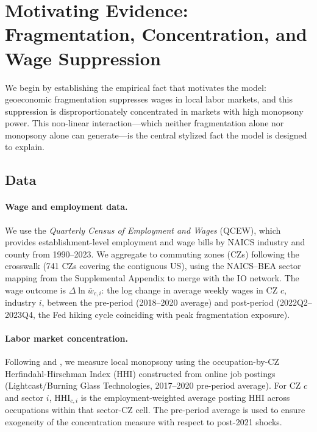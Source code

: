 \section{Motivating Evidence: Fragmentation, Concentration, and Wage Suppression}
\label{sec:empirical}

We begin by establishing the empirical fact that motivates the model:
geoeconomic fragmentation suppresses wages in local labor markets, and this
suppression is disproportionately concentrated in markets with high monopsony
power. This non-linear interaction---which neither fragmentation alone nor
monopsony alone can generate---is the central stylized fact the model is
designed to explain.

\subsection{Data}
\label{sec:data}

\paragraph{Wage and employment data.}
We use the \emph{Quarterly Census of Employment and Wages} (QCEW), which
provides establishment-level employment and wage bills by NAICS industry and
county from 1990--2023. We aggregate to commuting zones (CZs) following the
\citet{autor2013china} crosswalk (741 CZs covering the contiguous US), using
the NAICS--BEA sector mapping from the Supplemental Appendix to merge with the
IO network. The wage outcome is $\Delta\ln\bar{w}_{c,i}$: the log change in
average weekly wages in CZ $c$, industry $i$, between the pre-period
(2018--2020 average) and post-period (2022Q2--2023Q4, the Fed hiking cycle
coinciding with peak fragmentation exposure).

\paragraph{Labor market concentration.}
Following \citet{azar2020} and \citet{azar2022labor}, we measure local
monopsony using the occupation-by-CZ Herfindahl-Hirschman Index (HHI)
constructed from online job postings (Lightcast/Burning Glass Technologies,
2017--2020 pre-period average). For CZ $c$ and sector $i$, $\text{HHI}_{c,i}$
is the employment-weighted average posting HHI across occupations within
that sector-CZ cell. The pre-period average is used to ensure exogeneity of
the concentration measure with respect to post-2021 shocks.

